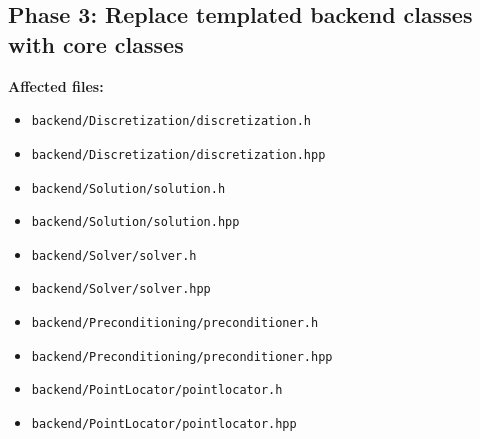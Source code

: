 \documentclass[11pt]{article}
\begin{document}
\subsection*{Phase 3: Replace templated backend classes with core classes}

\textbf{Affected files:}
\begin{itemize}[leftmargin=*]
\item \texttt{backend/Discretization/discretization.h}
\item \texttt{backend/Discretization/discretization.hpp}
\item \texttt{backend/Solution/solution.h}
\item \texttt{backend/Solution/solution.hpp}
\item \texttt{backend/Solver/solver.h}
\item \texttt{backend/Solver/solver.hpp}
\item \texttt{backend/Preconditioning/preconditioner.h}
\item \texttt{backend/Preconditioning/preconditioner.hpp}
\item \texttt{backend/PointLocator/pointlocator.h}
\item \texttt{backend/PointLocator/pointlocator.hpp}
\end{itemize}
\end{document}
